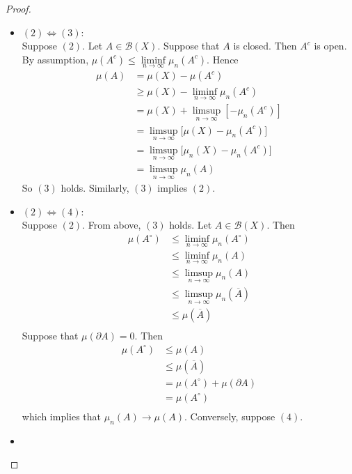 \documentclass[12pt]{amsart}
\theoremstyle{definition}
\newcommand{\MB}{\mathcal{B}}
\newcommand{\p}{\partial}
\newcommand{\limfn}{\liminf \limits_{n \rightarrow \infty}}
\newcommand{\limpn}{\limsup \limits_{n \rightarrow \infty}}
\begin{document}
	\begin{proof}\
		\begin{itemize}
			\item $(2) \iff (3)$: \\
			Suppose $(2)$. Let $A \in \MB(X)$. Suppose that $A$ is closed. Then $A^c$ is open. By assumption, $\mu(A^c) \leq \limfn \limits \mu_n(A^c)$. Hence 
			\begin{align*}
				\mu(A)
				&= \mu(X) - \mu(A^c) \\
				&\geq \mu(X) - \limfn \mu_n(A^c) \\
				&= \mu(X) + \limpn [- \mu_n(A^c)] \\
				&= \limpn \bigg[ \mu(X)  - \mu_n(A^c) \bigg] \\
				&= \limpn \bigg[ \mu_n(X)  - \mu_n(A^c) \bigg] \\
				&= \limpn \mu_n(A)
			\end{align*}
			So $(3)$ holds.
			Similarly, $(3)$ implies $(2)$.\\
			\item $(2) \iff (4)$: \\
			Suppose $(2)$. From above, $(3)$ holds. Let $A \in \MB(X)$. Then 
			\begin{align*}
				\mu(A^{\circ}) 
				& \leq \limfn \mu_n(A^{\circ}) \\
				& \leq  \limfn \mu_n(A) \\
				& \leq  \limpn \mu_n(A) \\
				& \leq  \limpn \mu_n(\overline{A}) \\
				& \leq  \mu(\overline{A}) \\
			\end{align*}
			Suppose that $\mu(\p A) = 0$. Then
			\begin{align*}
				\mu(A^{\circ}) 
				&\leq \mu(A) \\
				& \leq \mu(\overline{A}) \\
				&= \mu(A^{\circ}) + \mu(\p A) \\
				&= \mu(A^{\circ}) \\
			\end{align*}
			which implies that $\mu_n(A) \rightarrow \mu(A)$. Conversely, suppose $(4)$. 
			\item 
		\end{itemize}
	\end{proof}
\end{document}
